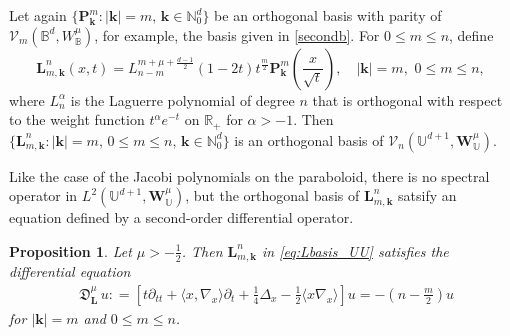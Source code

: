 \documentclass{amsart}
\newtheorem{prop}[thm]{Proposition}
\theoremstyle{remark}
\def\la{{\langle}}
\def\ra{{\rangle}}
\def\fD{{\mathfrak D}}
\def\a{{\alpha}}
\def\la{{\langle}}
\def\ra{{\rangle}}
\def\kb{{\mathbf k}}
\def\Lb{{\mathbf L}}
\def\Pb{{\mathbf P}}
\def\Wb{{\mathbf W}}
\def\CV{{\mathcal V}}
\def\BB{{\mathbb B}}
\def\NN{{\mathbb N}}
\def\RR{{\mathbb R}}
\def\UU{{\mathbb U}}
\def\f{\frac}
\begin{document}
Let again $\{\Pb_{\kb}^m: |\kb| = m, \, \kb\in \NN_0^d\}$ be an orthogonal basis with parity of 
$\CV_m(\BB^d,W_\BB^\mu)$, for example, the basis given in \eqref{secondb}. For $0 \le m \le n$, define  
\begin{equation} \label{eq:Lbasis_UU}
 \Lb_{m,\kb}^n(x,t) = L_{n-m}^{m+\mu+\f{d-1}{2}}(1-2 t) t^{\f{m}{2}} 
    \Pb_{\kb}^m \left(\frac{x}{\sqrt{t} }\right), \quad |\kb| = m, \,\, 0\le m \le n,
\end{equation}
where $L_n^\a$ is the Laguerre polynomial of degree $n$ that is orthogonal with respect to the weight
function $t^\a e^{-t}$ on $\RR_+$ for $\a > -1$.  
Then $\{\Lb_{m,\kb}^n: |\kb | = m, \, 0 \le m  \le n, \, \kb \in \NN_0^d\}$ is an orthogonal basis of 
$\CV_n(\UU^{d+1}, \Wb_\UU^{\mu})$. 

Like the case of the Jacobi polynomials on the paraboloid, there is no spectral operator in $L^2(\UU^{d+1}, \Wb_\UU^\mu)$,
but the orthogonal basis of $\Lb_{m,\kb}^n$ satsify an equation defined by a second-order differential operator. 

\begin{prop}
Let $\mu > -\f12$. Then $\Lb_{m,\kb}^n$ in \eqref{eq:Lbasis_UU} satisfies the differential equation 
\begin{align}\label{eq:diff-eqnUU_L}
 & \fD_{\Lb}^{\mu} \, u: = \left[ t \partial_{tt} + \la x,\nabla_x\ra \partial_t + \frac{1}{4}\Delta_x  
     -  \f12 \la x \nabla_x \ra  \right]  u 
       = - \left (n-\frac m 2 \right) u 
\end{align}
for $|\kb| = m$ and $0 \le m \le n$. 
\end{prop}
\end{document}
